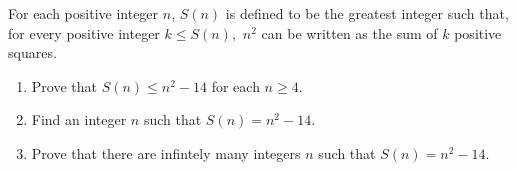 For each positive integer $n$, $S(n)$ is defined to be the greatest integer such that, for every positive integer $k \leq S(n),$ $n^{2}$ can be written as the sum of $k$ positive squares.

\begin{enumerate}[label = (\alph*)]
	\item Prove that $S(n) \leq n^{2} - 14$ for each $n \geq 4$.
	\item Find an integer $n$ such that $S(n) = n^{2} - 14$.
	\item Prove that there are infintely many integers $n$ such that $S(n) = n^{2}-14.$
\end{enumerate}
